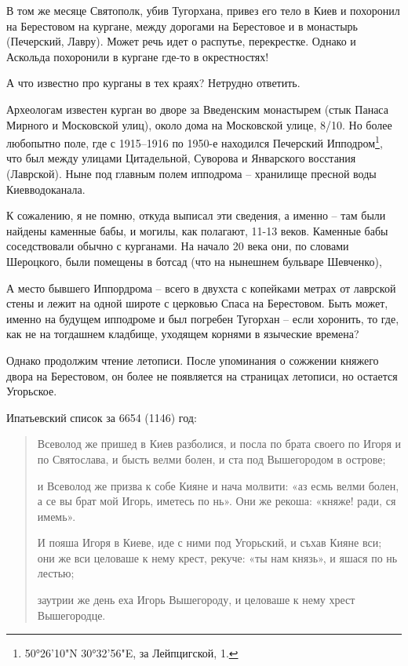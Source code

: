 В том же месяце Святополк, убив Тугорхана, привез его тело в Киев и похоронил на Берестовом на кургане, между дорогами на Берестовое и в монастырь (Печерский, Лавру). Может речь идет о распутье, перекрестке. Однако и Аскольда похоронили в кургане где-то в окрестностях!

А что известно про курганы в тех краях? Нетрудно ответить.

Археологам известен курган во дворе за Введенским монастырем (стык Панаса Мирного и Московской улиц), около дома на Московской улице, 8/10. Но более любопытно поле, где с 1915–1916 по 1950-е находился Печерский Ипподром\footnote{50°26'10"N 30°32'56"E, за Лейпцигской, 1.}, что был между улицами Цитадельной, Суворова и Январского восстания (Лаврской). Ныне под главным полем ипподрома – хранилище пресной воды Киевводоканала.

К сожалению, я не помню, откуда выписал эти сведения, а именно – там были найдены каменные бабы, и могилы, как полагают, 11-13 веков. Каменные бабы соседствовали обычно с курганами. На начало 20 века они, по словами Шероцкого, были помещены в ботсад (что на нынешнем бульваре Шевченко),

А место бывшего Иппордрома – всего в двухста с копейками метрах от лаврской стены и лежит на одной широте с церковью Спаса на Берестовом. Быть может, именно на будущем ипподроме и был погребен Тугорхан – если хоронить, то где, как не на тогдашнем кладбище, уходящем корнями в языческие времена?

Однако продолжим чтение летописи. После упоминания о сожжении княжего двора на Берестовом, он более не появляется на страницах летописи, но остается Угорьское.

Ипатьевский список за 6654 (1146) год:

\begin{quotation}
Всеволод же пришед в Киев разболися, и посла по брата своего по Игоря и по Святослава, и бысть велми болен, и ста под Вышегородом в острове;

и Всеволод же призва к собе Кияне и нача молвити: «аз есмь велми болен, а се вы брат мой Игорь, иметесь по нь». Они же рекоша: «княже! ради, ся имемь».

И пояша Игоря в Киеве, иде с ними под Угорьский, и съхав Кияне вси; они же вси целоваше к нему крест, рекуче: «ты нам князь», и яшася по нь лестью;

заутрии же день еха Игорь Вышегороду, и целоваше к нему хрест Вышегородце.



\end{quotation}

